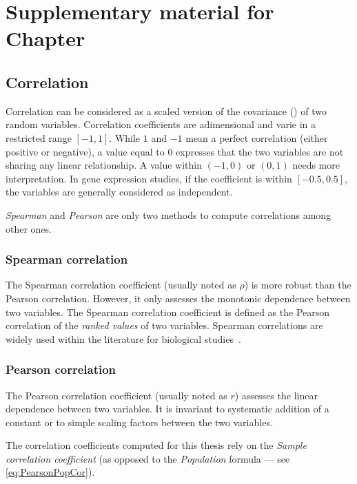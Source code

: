 \chapter{Suppl\texorpdfstring{ementary}{.} material for Chap\texorpdfstring{ter}{.}
}\label{ch:SupplExpress}

\section{Correlation}\label{sec:CorrMore}
Correlation can be considered as a scaled version of the covariance
() of two random variables.
Correlation coefficients are adimensional and varie in a restricted range $[-1,1]$.
While $1$ and $-1$ mean a perfect correlation (either positive or negative),
a value equal to $0$ expresses
that the two variables are not sharing any linear relationship.
A value within $(-1,0)$
or $(0,1)$ needs more interpretation.
In gene expression studies, if the coefficient is within $[-0.5,0.5]$,
the variables are generally considered as independent.

\emph{Spearman} and \emph{Pearson} are only two methods to compute correlations
among other ones.

\subsection{Spearman correlation}\label{subsec:SpearmanCor}
The Spearman correlation coefficient (usually noted as $\rho$)
is more robust than the Pearson correlation.
However, it only assesses the monotonic dependence between two variables.
The Spearman correlation coefficient is defined
as the Pearson correlation of the \emph{ranked values} of two variables.
Spearman correlations are widely used
within the literature for biological studies~.

\subsection{Pearson correlation}\label{subsec:PearsonCor}
The Pearson correlation coefficient (usually noted as $r$) assesses the linear
dependence between two variables.
It is invariant to systematic addition of a constant
or to simple scaling factors between the two variables.


The correlation coefficients computed for this thesis rely on the \emph{Sample
correlation coefficient} (as opposed to the \emph{Population}
formula --- see \cref{eq:PearsonPopCor}).

